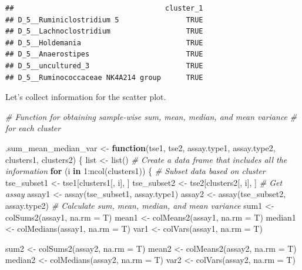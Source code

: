 \documentclass[
]{book}
\newenvironment{Shaded}{\begin{snugshade}}{\end{snugshade}}
\newcommand{\AttributeTok}[1]{\textcolor[rgb]{0.77,0.63,0.00}{#1}}
\newcommand{\CommentTok}[1]{\textcolor[rgb]{0.56,0.35,0.01}{\textit{#1}}}
\newcommand{\ControlFlowTok}[1]{\textcolor[rgb]{0.13,0.29,0.53}{\textbf{#1}}}
\newcommand{\DecValTok}[1]{\textcolor[rgb]{0.00,0.00,0.81}{#1}}
\newcommand{\FunctionTok}[1]{\textcolor[rgb]{0.00,0.00,0.00}{#1}}
\newcommand{\NormalTok}[1]{#1}
\newcommand{\OtherTok}[1]{\textcolor[rgb]{0.56,0.35,0.01}{#1}}
\newcommand{\SpecialCharTok}[1]{\textcolor[rgb]{0.00,0.00,0.00}{#1}}
\begin{document}
\begin{verbatim}
##                                    cluster_1
## D_5__Ruminiclostridium 5                TRUE
## D_5__Lachnoclostridium                  TRUE
## D_5__Holdemania                         TRUE
## D_5__Anaerostipes                       TRUE
## D_5__uncultured_3                       TRUE
## D_5__Ruminococcaceae NK4A214 group      TRUE
\end{verbatim}

Let's collect information for the scatter plot.

\begin{Shaded}
\begin{Highlighting}[]
\CommentTok{\# Function for obtaining sample{-}wise sum, mean, median, and mean variance}
\CommentTok{\# for each cluster}

\NormalTok{.sum\_mean\_median\_var }\OtherTok{\textless{}{-}} \ControlFlowTok{function}\NormalTok{(tse1, tse2, assay.type1, assay.type2, clusters1, clusters2) \{}
\NormalTok{  list }\OtherTok{\textless{}{-}} \FunctionTok{list}\NormalTok{()}
  \CommentTok{\# Create a data frame that includes all the information}
  \ControlFlowTok{for}\NormalTok{ (i }\ControlFlowTok{in} \DecValTok{1}\SpecialCharTok{:}\FunctionTok{ncol}\NormalTok{(clusters1)) \{}
    \CommentTok{\# Subset data based on cluster}
\NormalTok{    tse\_subset1 }\OtherTok{\textless{}{-}}\NormalTok{ tse1[clusters1[, i], ]}
\NormalTok{    tse\_subset2 }\OtherTok{\textless{}{-}}\NormalTok{ tse2[clusters2[, i], ]}
    \CommentTok{\# Get assay}
\NormalTok{    assay1 }\OtherTok{\textless{}{-}} \FunctionTok{assay}\NormalTok{(tse\_subset1, assay.type1)}
\NormalTok{    assay2 }\OtherTok{\textless{}{-}} \FunctionTok{assay}\NormalTok{(tse\_subset2, assay.type2)}
    \CommentTok{\# Calculate sum, mean, median, and mean variance}
\NormalTok{    sum1 }\OtherTok{\textless{}{-}} \FunctionTok{colSums2}\NormalTok{(assay1, }\AttributeTok{na.rm =}\NormalTok{ T)}
\NormalTok{    mean1 }\OtherTok{\textless{}{-}} \FunctionTok{colMeans2}\NormalTok{(assay1, }\AttributeTok{na.rm =}\NormalTok{ T)}
\NormalTok{    median1 }\OtherTok{\textless{}{-}} \FunctionTok{colMedians}\NormalTok{(assay1, }\AttributeTok{na.rm =}\NormalTok{ T)}
\NormalTok{    var1 }\OtherTok{\textless{}{-}} \FunctionTok{colVars}\NormalTok{(assay1, }\AttributeTok{na.rm =}\NormalTok{ T)}

\NormalTok{    sum2 }\OtherTok{\textless{}{-}} \FunctionTok{colSums2}\NormalTok{(assay2, }\AttributeTok{na.rm =}\NormalTok{ T)}
\NormalTok{    mean2 }\OtherTok{\textless{}{-}} \FunctionTok{colMeans2}\NormalTok{(assay2, }\AttributeTok{na.rm =}\NormalTok{ T)}
\NormalTok{    median2 }\OtherTok{\textless{}{-}} \FunctionTok{colMedians}\NormalTok{(assay2, }\AttributeTok{na.rm =}\NormalTok{ T)}
\NormalTok{    var2 }\OtherTok{\textless{}{-}} \FunctionTok{colVars}\NormalTok{(assay2, }\AttributeTok{na.rm =}\NormalTok{ T)}


\end{Highlighting}
\end{Shaded}
\end{document}
